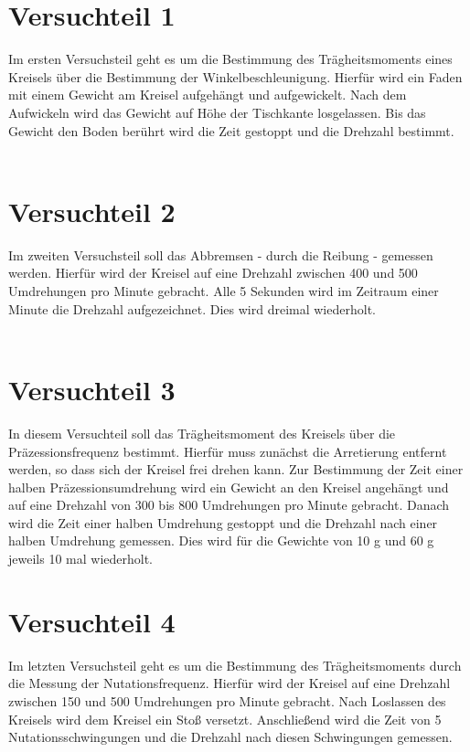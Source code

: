 \documentclass[12pt,a4paper,]{scrreprt}
\begin{document}
\section{Versuchteil 1}
Im ersten Versuchsteil geht es um die Bestimmung des Trägheitsmoments eines Kreisels über die Bestimmung der Winkelbeschleunigung. Hierfür wird ein Faden mit einem Gewicht am Kreisel aufgehängt und aufgewickelt. Nach dem Aufwickeln wird das Gewicht auf Höhe der Tischkante losgelassen. Bis das Gewicht den Boden  berührt wird die Zeit gestoppt und die Drehzahl bestimmt.\\
\\
\section{Versuchteil 2}
Im zweiten Versuchsteil soll das Abbremsen - durch die Reibung - gemessen werden. Hierfür wird der Kreisel auf eine Drehzahl zwischen 400 und 500 Umdrehungen pro Minute gebracht. Alle 5 Sekunden wird im Zeitraum einer Minute die Drehzahl aufgezeichnet. Dies wird dreimal wiederholt.\\
\\
\section{Versuchteil 3}
In diesem Versuchteil soll das Trägheitsmoment des Kreisels über die Präzessionsfrequenz bestimmt. Hierfür muss zunächst die Arretierung entfernt werden, so dass sich der Kreisel frei drehen kann. 
Zur Bestimmung der Zeit einer halben Präzessionsumdrehung wird ein Gewicht an den Kreisel angehängt und auf eine Drehzahl von 300 bis 800 Umdrehungen pro Minute gebracht. Danach wird die Zeit einer halben Umdrehung gestoppt und die Drehzahl nach einer halben Umdrehung gemessen. Dies wird für die Gewichte von 10 g und 60 g jeweils 10 mal wiederholt.
\\
\section{Versuchteil 4}
Im letzten Versuchsteil geht es um die Bestimmung des Trägheitsmoments durch die Messung der Nutationsfrequenz. Hierfür wird der Kreisel auf eine Drehzahl zwischen 150 und 500 Umdrehungen pro Minute gebracht. Nach Loslassen des Kreisels wird dem Kreisel ein Stoß versetzt. Anschließend wird die Zeit von 5 Nutationsschwingungen und die Drehzahl nach diesen Schwingungen gemessen. 
	\pagebreak
\end{document}
